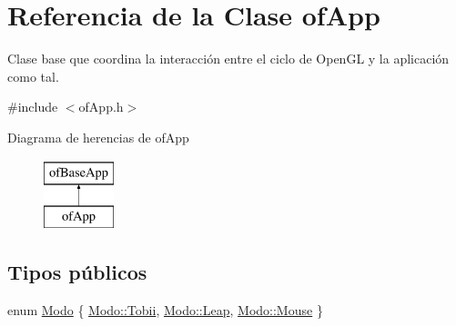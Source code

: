 \hypertarget{classof_app}{}\section{Referencia de la Clase of\+App}
\label{classof_app}


Clase base que coordina la interacción entre el ciclo de Open\+G\+L y la aplicación como tal.  




{\ttfamily \#include $<$of\+App.\+h$>$}

Diagrama de herencias de of\+App\begin{figure}[H]
\begin{center}
\leavevmode
\includegraphics[height=2.000000cm]{classof_app}
\end{center}
\end{figure}
\subsection*{Tipos públicos}
\begin{DoxyCompactItemize}
\item 
enum \hyperlink{classof_app_aab1f96029bf7fd45f397fc24647f3494}{Modo} \{ \hyperlink{classof_app_aab1f96029bf7fd45f397fc24647f3494a52695cfdddc55d6f4cb5638e7d4f9dbd}{Modo\+::\+Tobii}, 
\hyperlink{classof_app_aab1f96029bf7fd45f397fc24647f3494ad0bf83bf5396b08b6435d781c969c228}{Modo\+::\+Leap}, 
\hyperlink{classof_app_aab1f96029bf7fd45f397fc24647f3494af2a47c6809d88e175dade0ef7b16aa13}{Modo\+::\+Mouse}
 \}
\end{DoxyCompactItemize}

